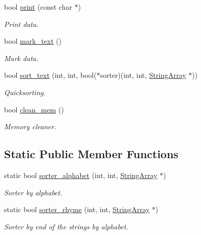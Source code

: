 \begin{DoxyCompactItemize}
bool \mbox{\hyperlink{class_string_array_a4b24347f36da4c591463d39ddbce1660}{print}} (const char $\ast$)
\begin{DoxyCompactList}\small\item\em Print data. \end{DoxyCompactList}\item 
bool \mbox{\hyperlink{class_string_array_acf2d98a2d86af02293de4bbe186b9f07}{mark\+\_\+text}} ()
\begin{DoxyCompactList}\small\item\em Mark data. \end{DoxyCompactList}\item 
bool \mbox{\hyperlink{class_string_array_ada4afa2d4aa21a149cc4fa710c19d8fd}{sort\+\_\+text}} (int, int, bool($\ast$sorter)(int, int, \mbox{\hyperlink{class_string_array}{String\+Array}} $\ast$))
\begin{DoxyCompactList}\small\item\em Quicksorting. \end{DoxyCompactList}\item 
\mbox{\label{class_string_array_ac12898da93f759f656e3e450ffa1d881}} 
bool \mbox{\hyperlink{class_string_array_ac12898da93f759f656e3e450ffa1d881}{clean\+\_\+mem}} ()
\begin{DoxyCompactList}\small\item\em Memory cleaner. \end{DoxyCompactList}\end{DoxyCompactItemize}
\subsection*{Static Public Member Functions}
\begin{DoxyCompactItemize}
\item 
static bool \mbox{\hyperlink{class_string_array_a38184dc0af4d596524871acafc79ae0c}{sorter\+\_\+alphabet}} (int, int, \mbox{\hyperlink{class_string_array}{String\+Array}} $\ast$)
\begin{DoxyCompactList}\small\item\em Sorter by alphabet. \end{DoxyCompactList}\item 
static bool \mbox{\hyperlink{class_string_array_a0abec5e876390258cf21629f4c6d0267}{sorter\+\_\+rhyme}} (int, int, \mbox{\hyperlink{class_string_array}{String\+Array}} $\ast$)
\begin{DoxyCompactList}\small\item\em Sorter by end of the strings by alphabet. \end{DoxyCompactList}\end{DoxyCompactItemize}

